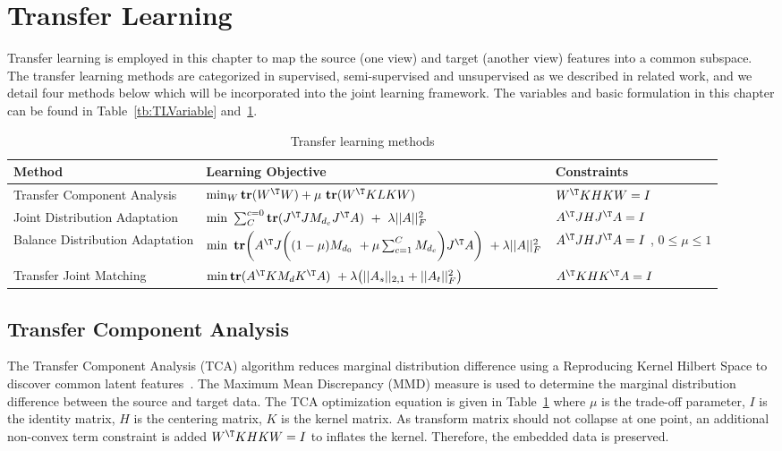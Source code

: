 \section{Transfer Learning}
Transfer learning is employed in this chapter to map the source (one view) and target (another view) features into a common subspace. The transfer learning methods are categorized in supervised, semi-supervised and unsupervised as we described in related work, and we detail four methods below which will be incorporated into the joint learning framework. The variables and  basic formulation in this chapter can be found in Table~\ref{tb:TLVariable} and~\ref{table:tcl}.
\begin{table}[h]
	\footnotesize
	\centering
	\caption{Transfer learning methods} 
		\begin{tabular}{|m{2cm}|m{9cm}|m{2.9cm}|}
			\hline   
			Method & Learning Objective & Constraints  \\ 
			\hline
			Transfer Component Analysis&  $\min_W \textbf{tr}(W^\T W) + \mu \ \textbf{tr}(W^\T KLKW)$ &$W^\T KHKW = I$\\ \hline
			Joint Distribution Adaptation&$\min\ \sum_{C}^{c=0} \textbf{tr}(J^\T JM_{d_c}J^\T A) \ + \ \lambda ||A||_F^2 $ & $A^\T JHJ^\T A= I$           \\ \hline
			Balance Distribution Adaptation&  $\min \  \textbf{tr} \bigg(A^\T J \bigg((1-\mu )M_{d_0} \ + \mu \sum_{c=1}^{C}M_{d_c}\bigg)J^\T A \bigg)\ +\lambda||A||_F^2$&$A^\T JHJ^\T A= I$ , $0\leq \mu \leq 1$         \\ \hline
			Transfer Joint Matching & $\min \textbf{tr}(A^\T KM_dK^\T A)\ +\lambda \big(||A_s||_{2,1} + ||A_t||_F^2 \big)$ &$A^\T KHK^\T A= I $           \\  \hline
		\end{tabular}%
	\label{table:tcl}
\end{table}

\subsection{Transfer Component Analysis}
The Transfer Component Analysis (TCA) algorithm reduces marginal distribution difference using a Reproducing Kernel Hilbert Space to discover common latent features~\cite{pan2011domain,8258419}. The Maximum Mean Discrepancy (MMD) measure is used to determine the marginal distribution difference between the source and target data. The TCA optimization equation is given in Table~\ref{table:tcl} where $\mu$ is the trade-off parameter, $I$ is the identity matrix, $H$ is the centering matrix, $K$ is the kernel matrix. As transform matrix should not collapse at one point, an additional non-convex term constraint is added $W^\T KHKW = I$ to inflates the kernel. Therefore, the embedded data is preserved.

